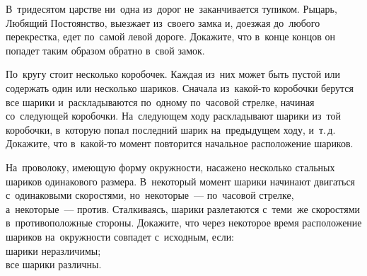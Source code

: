 \begin{problems}
\item
В~тридесятом царстве ни~одна из~дорог не~заканчивается тупиком.
Рыцарь, Любящий Постоянство, выезжает из~своего замка и, доезжая до~любого
перекрестка, едет по~самой левой дороге.
Докажите, что в~конце концов он попадет таким образом обратно в~свой замок.

\item
По~кругу стоит несколько коробочек.
Каждая из~них может быть пустой или содержать один или несколько шариков.
Сначала из~какой-то коробочки берутся все шарики и~раскладываются по~одному
по~часовой стрелке, начиная со~следующей коробочки.
На~следующем ходу раскладывают шарики из~той коробочки, в~которую попал
последний шарик на~предыдущем ходу, и~т.\,д.
Докажите, что в~какой-то момент повторится начальное расположение шариков.

\item
На~проволоку, имеющую форму окружности, насажено несколько стальных шариков
одинакового размера.
В~некоторый момент шарики начинают двигаться с~одинаковыми скоростями,
но~некоторые~--- по~часовой стрелке, а~некоторые~--- против.
Сталкиваясь, шарики разлетаются с~теми~же скоростями в~противоположные стороны.
Докажите, что через некоторое время расположение шариков на~окружности совпадет
с~исходным, если:
\\
\subproblem шарики неразличимы;
\\
\subproblem все шарики различны.

\end{problems}

